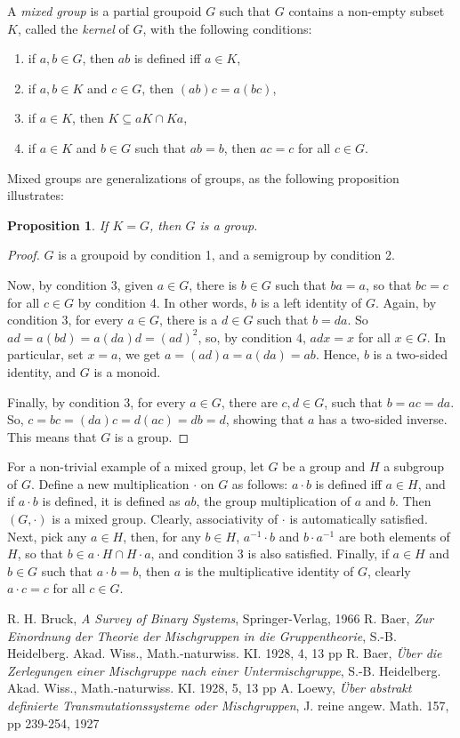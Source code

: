 \documentclass[12pt]{article}
\newtheorem{prop}{Proposition}
\begin{document}
A \emph{mixed group} is a partial groupoid $G$ such that $G$ contains a non-empty subset $K$, called the \emph{kernel} of $G$, with the following conditions:
\begin{enumerate}
\item if $a,b\in G$, then $ab$ is defined iff $a\in K$,
\item if $a,b\in K$ and $c\in G$, then $(ab)c=a(bc)$,
\item if $a\in K$, then $K\subseteq aK\cap Ka$,
\item if $a\in K$ and $b\in G$ such that $ab=b$, then $ac=c$ for all $c\in G$.
\end{enumerate}

Mixed groups are generalizations of groups, as the following proposition illustrates:

\begin{prop} If $K=G$, then $G$ is a group. \end{prop}

\begin{proof}
$G$ is a groupoid by condition 1, and a semigroup by condition 2.  

Now, by condition 3, given $a\in G$, there is $b\in G$ such that $ba=a$, so that $bc=c$ for all $c\in G$ by condition 4.  In other words, $b$ is a left identity of $G$.  Again, by condition 3, for every $a\in G$, there is a $d\in G$ such that $b=da$.  So $ad= a(bd)=a(da)d=(ad)^2$, so, by condition 4, $adx=x$ for all $x\in G$.  In particular, set $x=a$, we get $a=(ad)a=a(da)=ab$.  Hence, $b$ is a two-sided identity, and $G$ is a monoid.  

Finally, by condition 3, for every $a\in G$, there are $c,d\in G$, such that $b=ac=da$.  So, $c=bc=(da)c=d(ac)=db=d$, showing that $a$ has a two-sided inverse.  This means that $G$ is a group.
\end{proof}

For a non-trivial example of a mixed group, let $G$ be a group and $H$ a subgroup of $G$.  Define a new multiplication $\cdot$ on $G$ as follows: $a\cdot b$ is defined iff $a\in H$, and if $a\cdot b$ is defined, it is defined as $ab$, the group multiplication of $a$ and $b$.  Then $(G,\cdot)$ is a mixed group.  Clearly, associativity of $\cdot$ is automatically satisfied.  Next, pick any $a\in H$, then, for any $b\in H$, $a^{-1}\cdot b$ and $b\cdot a^{-1}$ are both elements of $H$, so that $b\in a\cdot H\cap H\cdot a$, and condition 3 is also satisfied.  Finally, if $a\in H$ and $b\in G$ such that $a\cdot b=b$, then $a$ is the multiplicative identity of $G$, clearly $a\cdot c=c$ for all $c\in G$.

\begin{thebibliography}{0}
R. H. Bruck,
{\it A Survey of Binary Systems}, Springer-Verlag, 1966
R. Baer,
{\it Zur Einordnung der Theorie der Mischgruppen in die Gruppentheorie}, S.-B. Heidelberg. Akad. Wiss., Math.-naturwiss. KI. 1928, 4, 13 pp
R. Baer,
{\it \"{U}ber die Zerlegungen einer Mischgruppe nach einer Untermischgruppe}, S.-B. Heidelberg. Akad. Wiss., Math.-naturwiss. KI. 1928, 5, 13 pp
A. Loewy,
{\it \"{U}ber abstrakt definierte Transmutationssysteme oder Mischgruppen}, J. reine angew. Math. 157, pp 239-254, 1927
\end{thebibliography}
\end{document}
